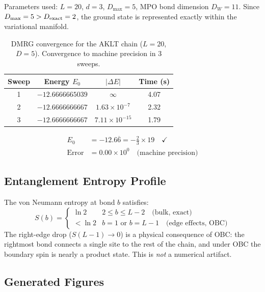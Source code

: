 \documentclass[aps,prb,onecolumn,scriptaddress]{revtex4-2}
\begin{document}
	Parameters used: $L = 20$, $d = 3$, $D_{\max} = 5$,
	MPO bond dimension $D_W = 11$.
	Since $D_{\max} = 5 > D_{\rm exact} = 2$, the ground state is represented
	exactly within the variational manifold.
	
	\begin{table}[h]
		\centering
		\begin{tabular}{cccc}
			\toprule
			Sweep & Energy $E_0$ & $|\Delta E|$ & Time (s) \\
			\midrule
			1  & $-12.6666665039$ & $\infty$   & 4.07 \\
			2  & $-12.6666666667$ & $1.63\times10^{-7}$ & 2.32 \\
			3  & $-12.6666666667$ & $7.11\times10^{-15}$ & 1.79 \\
			\bottomrule
		\end{tabular}
		\caption{DMRG convergence for the AKLT chain ($L=20$, $D=5$).
			Convergence to machine precision in 3 sweeps.}
	\end{table}
	
	\begin{align}
		E_0 &= -12.6\overline{6} = -\tfrac{2}{3}\times 19 \quad\checkmark\\
		\text{Error} &= 0.00\times10^{0} \quad\text{(machine precision)}
	\end{align}
	
	\subsection{Entanglement Entropy Profile}
	
	The von Neumann entropy at bond $b$ satisfies:
	\begin{equation}
		S(b) = \begin{cases}
			\ln 2 & 2 \leq b \leq L-2 \quad \text{(bulk, exact)} \\
			< \ln 2 & b = 1 \text{ or } b = L-1 \quad \text{(edge effects, OBC)}
		\end{cases}
	\end{equation}
	The right-edge drop ($S(L-1) \to 0$) is a physical consequence of OBC:
	the rightmost bond connects a single site to the rest of the chain, and
	under OBC the boundary spin is nearly a product state.
	This is \emph{not} a numerical artifact.
	
	\subsection{Generated Figures}
	
\end{document}
